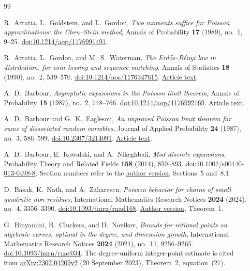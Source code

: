 \begin{thebibliography}{99}

R.~Arratia, L.~Goldstein, and L.~Gordon,
\emph{Two moments suffice for Poisson approximations:
the Chen--Stein method},
Annals of Probability \textbf{17} (1989), no.~1, 9--25.
\href{https://doi.org/10.1214/aop/1176991491}
{doi:10.1214/aop/1176991491}.

R.~Arratia, L.~Gordon, and M.~S.~Waterman,
\emph{The Erd\H{o}s--R\'enyi law in distribution, for coin tossing
and sequence matching},
Annals of Statistics \textbf{18} (1990), no.~2, 539--570.
\href{https://doi.org/10.1214/aos/1176347615}
{doi:10.1214/aos/1176347615}.
\href{https://dornsife.usc.edu/msw/wp-content/uploads/sites/236/2023/09/msw-093.pdf}
{Article text}.

A.~D.~Barbour,
\emph{Asymptotic expansions in the Poisson limit theorem},
Annals of Probability \textbf{15} (1987), no.~2, 748--766.
\href{https://doi.org/10.1214/aop/1176992169}
{doi:10.1214/aop/1176992169}.
\href{https://user.math.uzh.ch/barbour/pub/Barbour/AsympExpanPois.pdf}
{Article text}.

A.~D.~Barbour and G.~K.~Eagleson,
\emph{An improved Poisson limit theorem for sums of dissociated
random variables},
Journal of Applied Probability \textbf{24} (1987), no.~3, 586--599.
\href{https://doi.org/10.2307/3214091}
{doi:10.2307/3214091}.
\href{https://user.math.uzh.ch/barbour/pub/Barbour/BEagleson_ImprovedPoisson.pdf}
{Article text}.

A.~D.~Barbour, E.~Kowalski, and A.~Nikeghbali,
\emph{Mod-discrete expansions},
Probability Theory and Related Fields \textbf{158}
(2014), 859--893.
\href{https://doi.org/10.1007/s00440-013-0498-8}
{doi:10.1007/s00440-013-0498-8}.
Section numbers refer to the
\href{https://people.math.ethz.ch/~kowalski/mod-discrete.pdf}
{author version}, Sections~5 and~8.1.

D.~Basak, K.~Nath, and A.~Zaharescu,
\emph{Poisson behavior for chains of small quadratic non-residues},
International Mathematics Research Notices \textbf{2024} (2024),
no.~4, 3356--3390.
\href{https://doi.org/10.1093/imrn/rnad168}
{doi:10.1093/imrn/rnad168}.
\href{https://drive.google.com/file/d/1-7VxBG_KspRvDj35EFb9s9p13sR4rRjM/view}
{Author version}, Theorem~1.

G.~Binyamini, R.~Cluckers, and D.~Novikov,
\emph{Bounds for rational points on algebraic curves, optimal
in the degree, and dimension growth},
International Mathematics Research Notices \textbf{2024} (2024),
no.~11, 9256--9265.
\href{https://doi.org/10.1093/imrn/rnae034}
{doi:10.1093/imrn/rnae034}.
The degree-uniform integer-point estimate is cited from
\href{https://arxiv.org/abs/2302.04209v2}
{arXiv:2302.04209v2} (20 September 2023),
Theorem~2, equation~(27).


\end{thebibliography}
